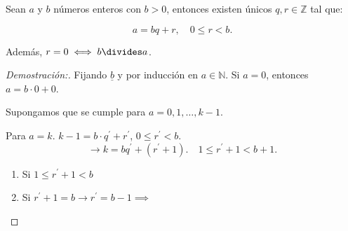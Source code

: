 \documentclass[oneside,a5paper]{memoir}
\begin{document}
\begin{theorem}

Sean $a$ y $b$ números enteros con $b>0$, entonces existen únicos $q,r\in\mathbb{Z}$ tal que:

\[a=bq+r,\quad0\leq r<b.\]

\noindent
Además, $r=0\iff b\divides a$.

\begin{proof}[Demostración:]
Fijando $\underline{b}$ y por inducción en $a\in\mathbb{N}$. Si $a=0$, entonces $a=b\cdot0+0$. \checkmark

\noindent
Supongamos que se cumple para $a=0,1,\ldots,k-1$.

\noindent
Para $a=k$. $k-1=b\cdot q^{\prime}+r^{\prime}$, $0\leq r^{\prime}<b$.
\[\longrightarrow k=bq^{\prime}+(r^{\prime}+1).\quad1\leq r^{\prime}+1<b+1.\]

\begin{enumerate}[font={\bfseries},label={$\bullet$)}]

\item Si $1\leq r^{\prime}+1<b$ \checkmark

\item Si $r^{\prime}+1=b\rightarrow r^{\prime}=b-1\implies$

\end{enumerate}
\end{proof}

\end{theorem}


\end{document}
